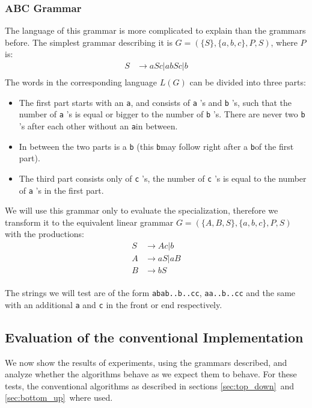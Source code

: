 \subsubsection{ABC Grammar}
The language of this grammar is more complicated to explain than the grammars before.
The simplest grammar describing it is $G=(\{S\}, \{a,b,c\},P,S)$, where $P$ is:
\begin{align*}
    S&\rightarrow aSc|abSc|b\\
\end{align*}
The words in the corresponding language $L(G)$ can be divided into three parts:
\begin{itemize}
    \item The first part starts with an \texttt{a}, and  consists of \texttt{a} 's and \texttt{b} 's, such that the number of \texttt{a} 's is equal or bigger to the number of \texttt{b} 's. There are never two \texttt{b} 's after each other without an \texttt{a}in between.
    \item In between the two parts is a \texttt{b} (this \texttt{b}may follow right after a \texttt{b}of the first part).
    \item The third part consists only of \texttt{c} 's, the number of \texttt{c} 's is equal to the number of \texttt{a} 's in the first part.
\end{itemize}

We will use this grammar only to evaluate the specialization, therefore we transform it to the equivalent linear grammar $G=(\{A,B,S\}, \{a,b,c\}, P, S)$ with the productions:
\begin{align*}
    S&\rightarrow Ac|b\\
    A&\rightarrow aS|aB\\
    B&\rightarrow bS\\
\end{align*}

The strings we will test are of the form \texttt{abab..b..cc}, \texttt{aa..b..cc} and the same with an additional \texttt{a} and \texttt{c} in the front or end respectively.


\subsection{Evaluation of the conventional Implementation}
We now show the results of experiments, using the grammars described, and analyze whether the algorithms behave as we expect them to behave.
For these tests, the conventional algorithms as described in sections \ref{sec:top_down}~and \ref{sec:bottom_up}~where used.

